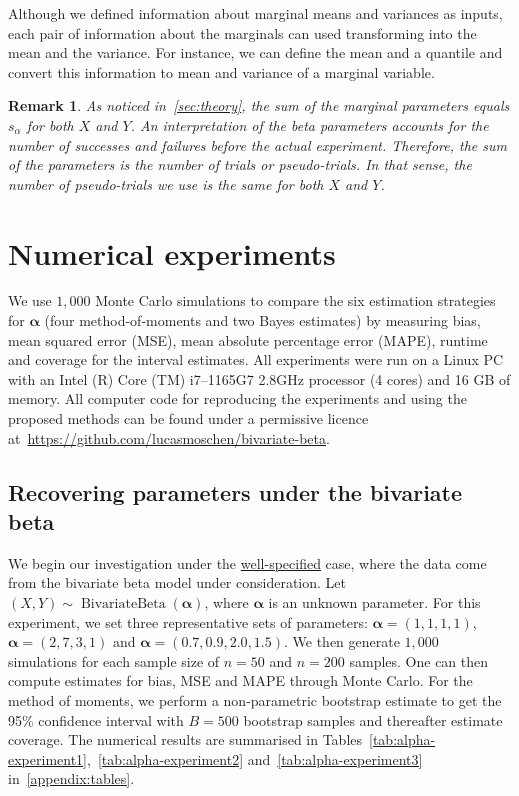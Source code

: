 \documentclass[a4paper, notitlepage, 10pt]{article}
\newcommand{\parameter}{\boldsymbol{\alpha}}
\newtheorem{remark}{Remark}[]
\theoremstyle{definition}
\begin{document}
Although we defined information about marginal means and variances as inputs, each pair of information about the marginals can used transforming into the mean and the variance. 
For instance, we can define the mean and a quantile and convert this information to mean and variance of a marginal variable.

\begin{remark}
    As noticed in~\autoref{sec:theory}, the sum of the marginal parameters equals $s_{\alpha}$ for both $X$ and $Y$.
    An interpretation of the beta parameters accounts for the number of successes and failures before the actual experiment. Therefore, the sum of the parameters is the number of trials or {\em pseudo-trials}.
    In that sense, the number of pseudo-trials we use is the same for both $X$ and $Y$.
\end{remark}

\section{Numerical experiments}

We use $1,000$ Monte Carlo simulations to compare the six estimation strategies for $\parameter$ (four method-of-moments and two Bayes estimates) by measuring bias, mean squared error (MSE), mean absolute percentage error (MAPE), runtime and coverage for the interval estimates.
All experiments were run on a Linux PC with an Intel (R) Core (TM) i7--1165G7 2.8GHz processor (4 cores) and 16 GB of memory.
All computer code for reproducing the experiments and using the proposed methods can be found under a permissive licence at~\url{https://github.com/lucasmoschen/bivariate-beta}.

\subsection{Recovering parameters under the bivariate beta}\label{sec:recovering-bivariate-beta}

We begin our investigation under the \underline{well-specified} case, where the data come from the bivariate beta model under consideration.
Let $(X,Y) \sim \operatorname{BivariateBeta}(\boldsymbol\alpha)$, where $\boldsymbol\alpha$ is an unknown parameter.
For this experiment, we set three representative sets of parameters: $\boldsymbol\alpha = (1,1,1,1)$, $\boldsymbol\alpha = (2, 7, 3, 1)$ and $\boldsymbol\alpha = (0.7, 0.9, 2.0, 1.5)$. 
We then generate $1,000$ simulations for each sample size of $n=50$ and $n=200$ samples. 
One can then compute estimates for bias, MSE and MAPE through Monte Carlo.
For the method of moments, we perform a non-parametric bootstrap estimate to get the 95\% confidence interval with $B=500$ bootstrap samples and thereafter estimate coverage.
The numerical results are summarised in Tables~\ref{tab:alpha-experiment1},~\ref{tab:alpha-experiment2} and~\ref{tab:alpha-experiment3} in~\autoref{appendix:tables}.
\end{document}

